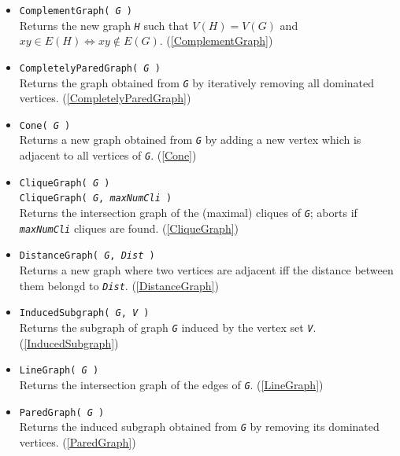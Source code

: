 \documentclass[a4paper,11pt]{report}
\begin{document}
{{\begin{itemize}
\item \texttt{ComplementGraph( \mbox{\texttt{\mdseries\slshape G}} )}\\
 Returns the new graph \mbox{\texttt{\mdseries\slshape H}} such that $V(H)=V(G)$ and $xy\in E(H) \iff xy \not\in E(G)$. (\ref{ComplementGraph}) 
\item \texttt{CompletelyParedGraph( \mbox{\texttt{\mdseries\slshape G}} )}\\
 Returns the graph obtained from \mbox{\texttt{\mdseries\slshape G}} by iteratively removing all dominated vertices. (\ref{CompletelyParedGraph}) 
\item \texttt{Cone( \mbox{\texttt{\mdseries\slshape G}} )}\\
 Returns a new graph obtained from \mbox{\texttt{\mdseries\slshape G}} by adding a new vertex which is adjacent to all vertices of \mbox{\texttt{\mdseries\slshape G}}. (\ref{Cone}) 
\item \texttt{CliqueGraph( \mbox{\texttt{\mdseries\slshape G}} )}\\
 \texttt{CliqueGraph( \mbox{\texttt{\mdseries\slshape G}}, \mbox{\texttt{\mdseries\slshape maxNumCli}} )}\\
 Returns the intersection graph of the (maximal) cliques of \mbox{\texttt{\mdseries\slshape G}}; aborts if \mbox{\texttt{\mdseries\slshape maxNumCli}} cliques are found. (\ref{CliqueGraph}) 
\item \texttt{DistanceGraph( \mbox{\texttt{\mdseries\slshape G}}, \mbox{\texttt{\mdseries\slshape Dist}} )}\\
 Returns a new graph where two vertices are adjacent iff the distance between
them belongd to \mbox{\texttt{\mdseries\slshape Dist}}. (\ref{DistanceGraph}) 
\item \texttt{InducedSubgraph( \mbox{\texttt{\mdseries\slshape G}}, \mbox{\texttt{\mdseries\slshape V}} )}\\
 Returns the subgraph of graph \mbox{\texttt{\mdseries\slshape G}} induced by the vertex set \mbox{\texttt{\mdseries\slshape V}}. (\ref{InducedSubgraph}) 
\item \texttt{LineGraph( \mbox{\texttt{\mdseries\slshape G}} )}\\
 Returns the intersection graph of the edges of \mbox{\texttt{\mdseries\slshape G}}. (\ref{LineGraph}) 
\item \texttt{ParedGraph( \mbox{\texttt{\mdseries\slshape G}} )}\\
 Returns the induced subgraph obtained from \mbox{\texttt{\mdseries\slshape G}} by removing its dominated vertices. (\ref{ParedGraph}) 

\end{itemize}}}
\end{document}
